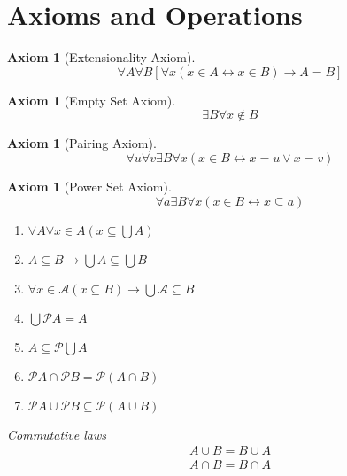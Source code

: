 \documentclass[letterpaper, 10pt]{article}
\numberwithin{thm}{section}
\newtheorem{axiom}[thm]{Axiom}
\theoremstyle{definition}
\begin{document}
\section{Axioms and Operations}

\begin{axiom}[Extensionality Axiom]
	\begin{equation*}
		\forall A\forall B[\forall x(x \in A \leftrightarrow x \in B)
		\rightarrow A = B]
	\end{equation*}
\end{axiom}

\begin{axiom}[Empty Set Axiom]
	\begin{equation*}
		\exists B \forall x \notin B
	\end{equation*}
\end{axiom}


\begin{axiom}[Pairing Axiom]
	\begin{equation*}
		\forall u \forall v \exists B \forall x(x \in B \leftrightarrow 
		x = u \lor x = v)
	\end{equation*}
\end{axiom}

\begin{axiom}[Power Set Axiom]
	\begin{equation*}
		\forall a \exists B \forall x (x \in B \leftrightarrow x \subseteq a)
	\end{equation*}
\end{axiom}

\begin{enumerate}[label=\arabic*.]
	\item $\forall A \forall x \in A (x \subseteq \bigcup A)$
	\item $A \subseteq B \rightarrow \bigcup A \subseteq \bigcup B$
	\item $\forall x \in \mathscr{A} (x \subseteq B) \rightarrow \bigcup \mathscr{A}
		\subseteq B$
	\item $\bigcup\mathscr{P}A = A$
	\item $A \subseteq \mathscr{P}\bigcup A$
	\item $\mathscr{P}A \cap \mathscr{P}B = \mathscr{P}(A \cap B)$
	\item $\mathscr{P}A \cup \mathscr{P}B \subseteq \mathscr{P}(A \cup B)$
\end{enumerate}

\emph{Commutative laws}
\begin{gather*}
	A \cup B = B \cup A \\
	A \cap B = B \cap A
\end{gather*}
\end{document}
